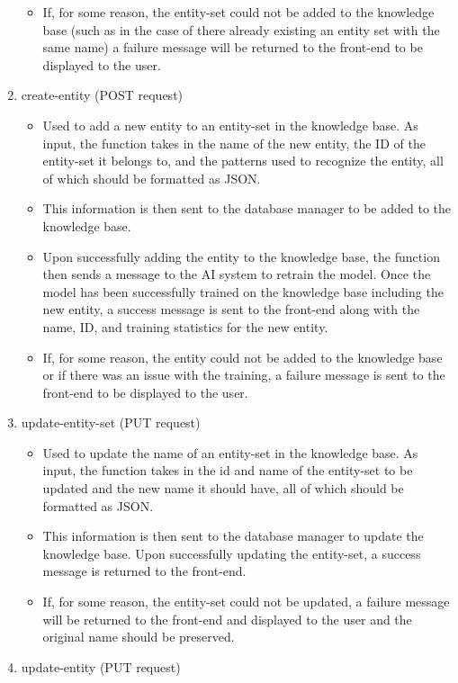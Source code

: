 \documentclass[titlepage, 12pt]{article}
\begin{document}
\begin{enumerate}
\begin{itemize}
        \item If, for some reason, the entity-set could not be added to the knowledge base (such as in the case of there already existing an entity set with the same name) a failure message will be returned to the front-end to be displayed to the user.
    \end{itemize}
    \item create-entity (POST request)
    \begin{itemize}
        \item Used to add a new entity to an entity-set in the knowledge base. As input, the function takes in the name of the new entity, the ID of the entity-set it belongs to, and the patterns used to recognize the entity, all of which should be formatted as JSON.
        \item This information is then sent to the database manager to be added to the knowledge base.
        \item Upon successfully adding the entity to the knowledge base, the function then sends a message to the AI system to retrain the model. Once the model has been successfully trained on the knowledge base including the new entity, a success message is sent to the front-end along with the name, ID, and training statistics for the new entity. 
        \item If, for some reason, the entity could not be added to the knowledge base or if there was an issue with the training, a failure message is sent to the front-end to be displayed to the user.
    \end{itemize}
    \item update-entity-set (PUT request)
    \begin{itemize}
        \item Used to update the name of an entity-set in the knowledge base. As input, the function takes in the id and name of the entity-set to be updated and the new name it should have, all of which should be formatted as JSON.
        \item This information is then sent to the database manager to update the knowledge base. Upon successfully updating the entity-set, a success message is returned to the front-end.
        \item If, for some reason, the entity-set could not be updated, a failure message will be returned to the front-end and displayed to the user and the original name should be preserved.
    \end{itemize}
    \item update-entity (PUT request)

\end{enumerate}
\end{document}
